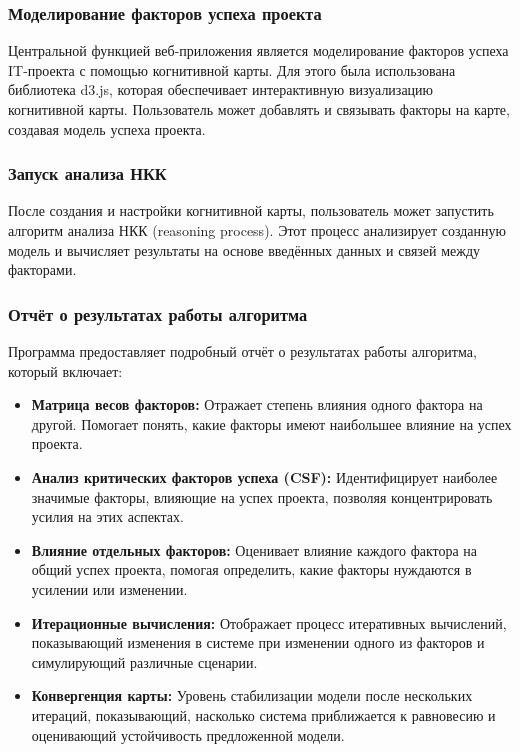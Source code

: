 \documentclass{article}
\begin{document}
    \subsubsection{Моделирование факторов успеха проекта}

    Центральной функцией веб-приложения является моделирование факторов успеха IT-проекта с помощью когнитивной карты. Для этого была использована библиотека d3.js, которая обеспечивает интерактивную визуализацию когнитивной карты. Пользователь может добавлять и связывать факторы на карте, создавая модель успеха проекта.

    \subsubsection{Запуск анализа НКК}

    После создания и настройки когнитивной карты, пользователь может запустить алгоритм анализа НКК (reasoning process). Этот процесс анализирует созданную модель и вычисляет результаты на основе введённых данных и связей между факторами.

    \subsubsection{Отчёт о результатах работы алгоритма}

    Программа предоставляет подробный отчёт о результатах работы алгоритма, который включает:
    \begin{itemize}
        \item \textbf{Матрица весов факторов:} Отражает степень влияния одного фактора на другой. Помогает понять, какие факторы имеют наибольшее влияние на успех проекта.
        \item \textbf{Анализ критических факторов успеха (CSF):} Идентифицирует наиболее значимые факторы, влияющие на успех проекта, позволяя концентрировать усилия на этих аспектах.
        \item \textbf{Влияние отдельных факторов:} Оценивает влияние каждого фактора на общий успех проекта, помогая определить, какие факторы нуждаются в усилении или изменении.
        \item \textbf{Итерационные вычисления:} Отображает процесс итеративных вычислений, показывающий изменения в системе при изменении одного из факторов и симулирующий различные сценарии.
        \item \textbf{Конвергенция карты:} Уровень стабилизации модели после нескольких итераций, показывающий, насколько система приближается к равновесию и оценивающий устойчивость предложенной модели.
    \end{itemize}
\end{document}

